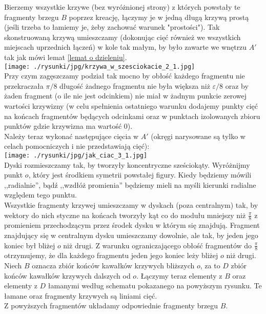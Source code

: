 \documentclass[a4paper, 12pt, twosided]{article}
\newcommand{\rysunek}[1]{\hfill \break\\[16pt] \Huge \textbf{\textcolor{violet}{Brakujący rysunek 
\normalsize
#1}} \hfill
\break \\[16pt] \normalsize}
\begin{document}
Bierzemy wszystkie krzywe (bez wyróżnionej strony) z których powstały te fragmenty brzegu $B$ 
poprzez kreację, 
łączymy je
w jedną długą krzywą prostą (jeśli trzeba to łamiemy je, żeby zachować warunek "prostości").
Tak skonstruowaną krzywą umieszczamy (dokonując cięć również we wszystkich miejscach uprzednich 
łączeń) w kole tak małym, by było zawarte we wnętrzu $A'$ tak jak mówi 
lemat \ref{lemat o dzieleniu}. \\
\texttt{[image: ./rysunki/jpg/krzywa\_w\_szesciokacie\_2\_1.jpg]} \\
Przy czym zagęszczamy podział tak mocno by obłość każdego fragmentu nie
przekraczała $\pi/8$ 
długość żadnego fragmentu nie była większa niż $\varepsilon/8$ oraz 
by żaden fragment (o ile nie jest odcinkiem) nie miał w żadnym punkcie zerowej wartości krzywizny 
(w celu spełnienia ostatniego warunku dodajemy punkty cięć na końcach fragmentów będących 
odcinkami oraz w punktach izolowanych zbioru punktów gdzie krzywizna ma wartość $0$). \\
Należy teraz wykonać następujące cięcia w $A'$ (okręgi narysowane są tylko w celach 
pomocniczych i nie przedstawiają cięć): \\
\texttt{[image: ./rysunki/jpg/jak\_ciac\_3\_1.jpg]} \\
Dyski rozmieszczamy tak, by tworzyły koncentryczne sześciokąty. Wyróżnijmy punkt $o$, który jest 
środkiem symetrii powstałej figury. Kiedy będziemy mówili ,,radialnie'', bądź ,,wzdłóż promienia'' 
będziemy mieli na myśli kierunki radialne względem tego punktu. \\
Wszystkie fragmenty krzywej umieszczamy w dyskach (poza centralnym) tak, by wektory do nich styczne 
 na końcach 
tworzyły kąt co do modułu mniejszy niż $\frac{\pi}{8}$ z promieniem przechodzącym przez środek 
dysku w którym się znajdują. Fragment znajdujący się w centralnym dysku umieszczamy dowolnie, ale 
 tak, by jeden jego koniec był bliżej $o$ niż drugi. Z 
warunku ograniczającego obłość fragmentów do $\frac{\pi}{8}$ 
otrzymujemy, że dla każdego fragmentu jeden jego koniec leży bliżej $o$ niż drugi. 
Niech $B$ oznacza zbiór końców kawałków krzywych bliższych $o$, za to $D$ zbiór końców 
kawałków krzywych dalszych od $o$. Łączymy teraz elementy z $B$ oraz elementy z $D$ łamanymi 
według schematu pokazanego na powyższym rysunku. Te łamane oraz fragmenty krzywych są liniami cięć. 
\\
\noindent Z powyższych fragmentów układamy odpowiednie fragmenty brzegu $B$. \\
\end{document}
